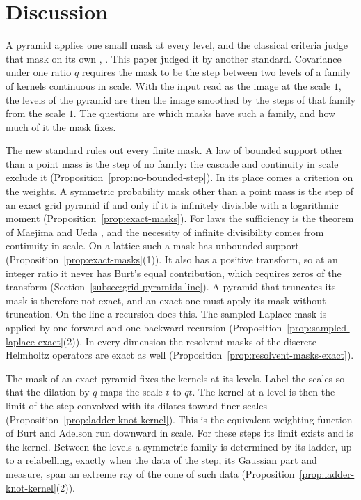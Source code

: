 \section{Discussion}
\label{sec:discussion}

A pyramid applies one small mask at every level, and the classical criteria judge that mask on its
own \cite[p.~533]{burt1983laplacian}, \cite{meer1987frequency}. This paper judged it by another
standard. Covariance under one ratio $q$ requires the mask to be the step between two levels of a family
of kernels continuous in scale. With the input read as the image at the scale $1$, the levels of the
pyramid are then the image smoothed by the steps of that family from the scale $1$. The questions are which masks have such a family, and how much of it the mask fixes.

The new standard rules out every finite mask. A law of bounded support other than a point mass is
the step of no family: the cascade and continuity in scale exclude it
(Proposition~\ref{prop:no-bounded-step}). In its place
comes a criterion on the weights. A symmetric probability mask other than a point mass is the step of an exact
grid pyramid if and only if it is infinitely divisible with a logarithmic moment
(Proposition~\ref{prop:exact-masks}). For laws the sufficiency is the theorem of Maejima and Ueda
\cite[Thm.~3.3, p.~353]{maejima2009stochastic}, and the necessity of infinite divisibility comes from
continuity in scale. On a lattice such a mask has unbounded support
(Proposition~\ref{prop:exact-masks}(1)). It also has a positive transform, so at an integer ratio
it never has Burt's equal contribution, which requires zeros of the transform
(Section~\ref{subsec:grid-pyramids-line}). A pyramid that truncates its mask is therefore not
exact, and an
exact one must apply its mask without truncation. On the line a recursion does this. The sampled
Laplace mask is applied by one forward and one backward recursion
(Proposition~\ref{prop:sampled-laplace-exact}(2)). In every dimension the resolvent masks of the
discrete Helmholtz operators are exact as well (Proposition~\ref{prop:resolvent-masks-exact}).

The mask of an exact pyramid fixes the kernels at its levels. Label the scales so that the
dilation by $q$ maps the scale $t$ to $qt$. The kernel at a level is then the limit of the step
convolved with its dilates toward finer scales (Proposition~\ref{prop:ladder-knot-kernel}). This
is the equivalent weighting function of Burt and Adelson run downward in scale. For these steps its
limit exists and is the kernel. Between the levels a symmetric family is determined by its ladder,
up to a relabelling, exactly when the data of the step, its Gaussian part and \Levy{} measure, span
an extreme ray of the cone of such data (Proposition~\ref{prop:ladder-knot-kernel}(2)).

